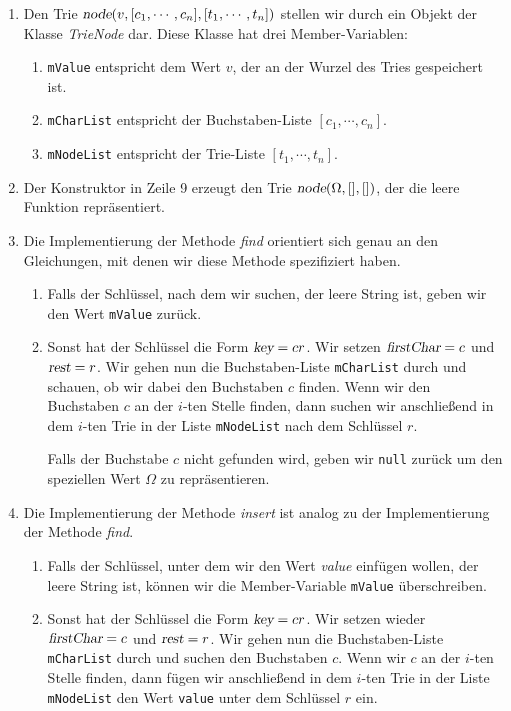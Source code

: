 \begin{enumerate}
\item Den Trie $\textsl{node}(v, [c_1,\cdots,c_n], [t_1,\cdots,t_n])$ stellen wir durch ein Objekt der Klasse
      \textsl{TrieNode} dar.  Diese Klasse hat drei Member-Variablen:
      \begin{enumerate}
      \item \texttt{mValue} entspricht dem Wert $v$, der an der Wurzel des Tries
             gespeichert ist.
      \item \texttt{mCharList} entspricht der Buchstaben-Liste $[c_1,\cdots,c_n]$.
      \item \texttt{mNodeList} entspricht der Trie-Liste $[t_1,\cdots,t_n]$.
      \end{enumerate}
\item Der Konstruktor in Zeile 9 erzeugt den Trie $\textsl{node}(\Omega, [], [])$, der die
      leere Funktion repr\"asentiert.
\item Die Implementierung der Methode \textsl{find} orientiert sich genau an den Gleichungen, 
      mit denen wir diese Methode spezifiziert haben.
      \begin{enumerate}
      \item Falls der Schl\"ussel, nach dem wir suchen, der leere String ist,
            geben wir den Wert \texttt{mValue} zur\"uck.
      \item Sonst hat der Schl\"ussel die Form $\textsl{key} = cr$. Wir setzen
            $\textsl{firstChar} = c$ und $\textsl{rest} = r$.  Wir gehen nun die
            Buchstaben-Liste \texttt{mCharList} durch und schauen, ob wir 
            dabei den Buchstaben $c$ finden.  Wenn  wir den Buchstaben $c$ an der $i$-ten
            Stelle finden, dann suchen wir anschlie{\ss}end  in dem $i$-ten Trie in der Liste 
            \texttt{mNodeList} nach dem Schl\"ussel $r$.

            Falls der Buchstabe $c$ nicht gefunden wird, geben wir \texttt{null} zur\"uck um
            den speziellen Wert $\Omega$ zu repr\"asentieren.
      \end{enumerate}
\item Die Implementierung der Methode \textsl{insert} ist analog zu der Implementierung
      der Methode \textsl{find}.
      \begin{enumerate}
      \item Falls der Schl\"ussel, unter dem wir den Wert \textsl{value} einf\"ugen wollen, der
            leere String ist, k\"onnen  wir die Member-Variable \texttt{mValue} \"uberschreiben.
      \item Sonst hat der Schl\"ussel die Form $\textsl{key} = cr$. Wir setzen wieder
            $\textsl{firstChar} = c$ und $\textsl{rest} = r$.  Wir gehen nun die
            Buchstaben-Liste \texttt{mCharList} durch und suchen den Buchstaben $c$.  
            Wenn wir $c$ an der $i$-ten
            Stelle finden, dann f\"ugen wir anschlie{\ss}end  in dem $i$-ten Trie in der Liste 
            \texttt{mNodeList} den Wert \texttt{value} unter dem Schl\"ussel $r$ ein.


\end{enumerate}
\end{enumerate}
